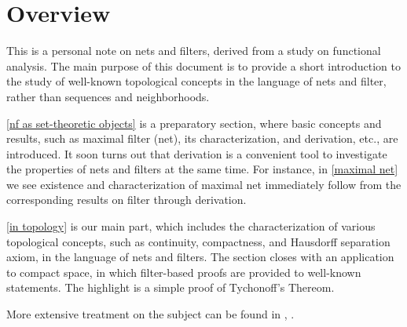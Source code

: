 \documentclass[a4paper,12pt]{article}
\begin{document}
\section*{Overview}
This is a personal note on nets and filters, derived from a study on functional analysis.
The main purpose of this document is to provide a short introduction to the study of well-known topological concepts in the language of nets and filter, rather than sequences and neighborhoods.

\ref{nf as set-theoretic objects} is a preparatory section, where basic concepts and results, such as maximal filter (net), its characterization, and derivation, etc., are introduced. It soon turns out that derivation is a convenient tool to investigate the properties of nets and filters at the same time. For instance, in \ref{maximal net} we see existence and characterization of maximal net immediately follow from the corresponding results on filter through derivation.

\ref{in topology} is our main part, which includes the characterization of various topological concepts, such as continuity, compactness, and Hausdorff separation axiom, in the language of nets and filters.
The section closes with an application to compact space, in which filter-based proofs are provided to well-known statements. The highlight is a simple proof of Tychonoff's Thereom.

More extensive treatment on the subject can be found in \cite{bour:tplgy}, \cite{nagata:tplgy}.
\end{document}
